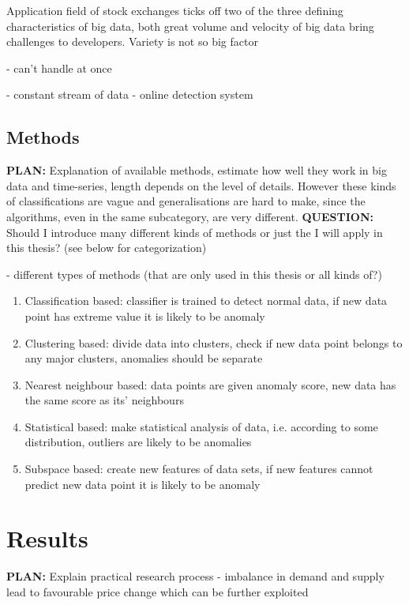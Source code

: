 \documentclass{tut-thesis}
\begin{document}
Application field of stock exchanges ticks off two of the three defining characteristics of big data, both great volume and velocity of big data bring challenges to developers. Variety is not so big factor

- can't handle at once

- constant stream of data
- online detection system


\section{Methods}
\textbf{PLAN:} Explanation of available methods, estimate how well they work in big data and time-series, length depends on the level of details. However these kinds of classifications are vague and generalisations are hard to make, since the algorithms, even in the same subcategory, are very different. 
\textbf{QUESTION:} Should I introduce many different kinds of methods or just the I will apply in this thesis? (see below for categorization)

- different types of methods (that are only used in this thesis or all kinds of?)
\begin{enumerate}
	\item Classification based: classifier is trained to detect normal data, if new data point has extreme value it is likely to be anomaly
	\item Clustering based: divide data into clusters, check if new data point belongs to any major clusters, anomalies should be separate 
	\item Nearest neighbour based: data points are given anomaly score, new data has the same score as its' neighbours
	\item Statistical based: make statistical analysis of data, i.e. according to some distribution, outliers are likely to be anomalies
	\item Subspace based: create new features of data sets, if new features cannot predict new data point it is likely to be anomaly
\end{enumerate}

\chapter{Results}
\textbf{PLAN:} Explain practical research process
- imbalance in demand and supply lead to favourable price change which can be further exploited
\end{document}
